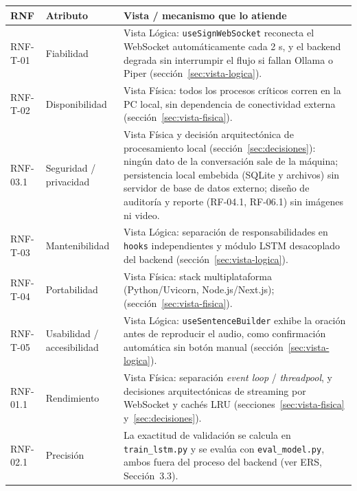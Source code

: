 \begin{longtable}{>{\raggedright\arraybackslash}p{2.3cm} >{\raggedright\arraybackslash}p{2.8cm} >{\raggedright\arraybackslash}p{8.6cm}}
    \toprule
    \textbf{RNF} & \textbf{Atributo} & \textbf{Vista / mecanismo que lo atiende} \\
    \midrule
    \endhead
    RNF-T-01 & Fiabilidad &
    Vista Lógica: \texttt{useSignWebSocket} reconecta el WebSocket
    automáticamente cada 2 s, y el backend degrada sin interrumpir el flujo
    si fallan Ollama o Piper (sección~\ref{sec:vista-logica}). \\

    RNF-T-02 & Disponibilidad &
    Vista Física: todos los procesos críticos corren en la PC local, sin
    dependencia de conectividad externa (sección~\ref{sec:vista-fisica}). \\

    RNF-03.1 & Seguridad / privacidad &
    Vista Física y decisión arquitectónica de procesamiento local
    (sección~\ref{sec:decisiones}): ningún dato de la conversación sale de
    la máquina; persistencia local embebida (SQLite y archivos) sin servidor de base de datos externo;
    diseño de auditoría y reporte (RF-04.1, RF-06.1) sin imágenes ni video. \\

    RNF-T-03 & Mantenibilidad &
    Vista Lógica: separación de responsabilidades en \texttt{hooks}
    independientes y módulo LSTM desacoplado del backend
    (sección~\ref{sec:vista-logica}). \\

    RNF-T-04 & Portabilidad &
    Vista Física: stack multiplataforma (Python/Uvicorn, Node.js/Next.js);
    (sección~\ref{sec:vista-fisica}). \\

    RNF-T-05 & Usabilidad / accesibilidad &
    Vista Lógica: \texttt{useSentenceBuilder} exhibe la oración antes de
    reproducir el audio, como confirmación automática sin botón manual
    (sección~\ref{sec:vista-logica}). \\

    RNF-01.1 & Rendimiento &
    Vista Física: separación \textit{event loop} / \textit{threadpool}, y
    decisiones arquitectónicas de streaming por WebSocket y cachés LRU
    (secciones~\ref{sec:vista-fisica} y~\ref{sec:decisiones}). \\

    RNF-02.1 & Precisión &
    La exactitud de validación se calcula en
    \texttt{train\_lstm.py} y se evalúa con \texttt{eval\_model.py},
    ambos fuera del proceso del backend (ver ERS, Sección~3.3). \\


\end{longtable}
